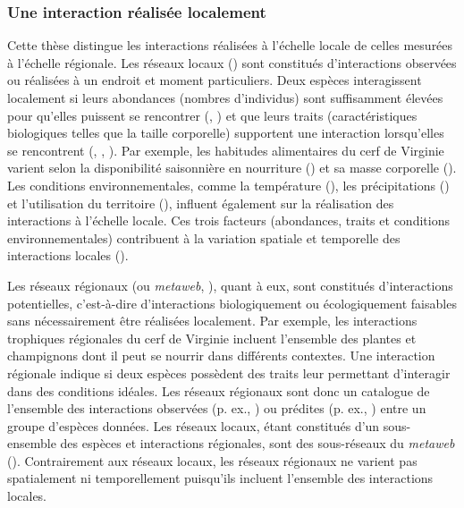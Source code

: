 \subsubsection{Une interaction réalisée localement} 

Cette thèse distingue les interactions réalisées à l'échelle locale de celles
mesurées à l'échelle régionale. Les réseaux locaux
(\cite{Poisot2012Dissimilarity}) sont constitués d'interactions observées ou
réalisées à un endroit et moment particuliers. Deux espèces interagissent
localement si leurs abondances (nombres d'individus) sont suffisamment élevées
pour qu'elles puissent se rencontrer (\cite{Canard2012Emergence},
\cite{Canard2014Empirical}) et que leurs traits (caractéristiques biologiques
telles que la taille corporelle) supportent une interaction lorsqu'elles se
rencontrent (\cite{Bolnick2011Why}, \cite{Gravel2013Inferring},
\cite{Stouffer2011Role}). Par exemple, les habitudes alimentaires du cerf de
Virginie varient selon la disponibilité saisonnière en nourriture
(\cite{Short1975Nutrition}) et sa masse corporelle (\cite{Luna2013Influence}).
Les conditions environnementales, comme la température
(\cite{Angilletta2004Temperature}), les précipitations
(\cite{Woodward2012Climate}) et l'utilisation du territoire
(\cite{Tylianakis2007Habitat}), influent également sur la réalisation des
interactions à l'échelle locale. Ces trois facteurs (abondances, traits et
conditions environnementales) contribuent à la variation spatiale et temporelle
des interactions locales (\cite{Poisot2015Species}). 

Les réseaux régionaux (ou \textit{metaweb}, \cite{Pascual2006Ecological}), quant
à eux, sont constitués d'interactions potentielles, c'est-à-dire d'interactions
biologiquement ou écologiquement faisables sans nécessairement être réalisées
localement. Par exemple, les interactions trophiques régionales du cerf de
Virginie incluent l'ensemble des plantes et champignons dont il peut se nourrir
dans différents contextes. Une interaction régionale indique si deux espèces
possèdent des traits leur permettant d'interagir dans des conditions idéales.
Les réseaux régionaux sont donc un catalogue de l'ensemble des interactions
observées (p. ex., \cite{Maiorano2020Tetraeu}) ou prédites (p. ex.,
\cite{Strydom2022Food}) entre un groupe d'espèces données. Les réseaux locaux,
étant constitués d'un sous-ensemble des espèces et interactions régionales, sont
des sous-réseaux du \textit{metaweb} (\cite{Saravia2022Ecological}).
Contrairement aux réseaux locaux, les réseaux régionaux ne varient pas
spatialement ni temporellement puisqu'ils incluent l'ensemble des interactions
locales. 

